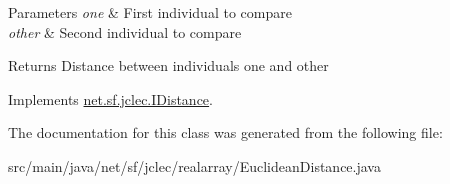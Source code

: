 \begin{DoxyParams}{Parameters}
{\em one} & First individual to compare \\
\hline
{\em other} & Second individual to compare\\
\hline
\end{DoxyParams}
\begin{DoxyReturn}{Returns}
Distance between individuals {\ttfamily one} and {\ttfamily other}
\end{DoxyReturn}
 

Implements \hyperlink{interfacenet_1_1sf_1_1jclec_1_1_i_distance_a6f0220da1f5f7926f0ecc15c30b8a7d6}{net.\-sf.\-jclec.\-I\-Distance}.



The documentation for this class was generated from the following file\-:\begin{DoxyCompactItemize}
\item 
src/main/java/net/sf/jclec/realarray/Euclidean\-Distance.\-java\end{DoxyCompactItemize}
